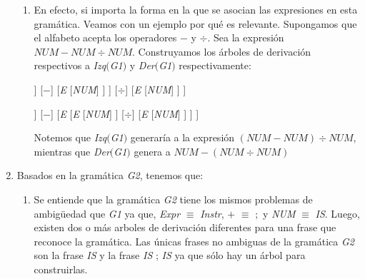 \documentclass[a4paper, 10pt]{article}
\begin{document}
\begin{enumerate}
\begin{enumerate}
			\item En efecto, si importa la forma en la que se asocian las expresiones en esta gramática. Veamos con
			un ejemplo por qué es relevante. Supongamos que el alfabeto acepta los operadores $-$ y $\div$. Sea la expresión
			$\textit{NUM} - \textit{NUM} \div \textit{NUM}$. Construyamos los árboles de derivación respectivos a 
			\textit{Izq}$($\textit{G1}$)$ y \textit{Der}$($\textit{G1}$)$ respectivamente:\\
			\begin{center}
			\begin{forest}
					[\textit{E}
						[\textit{E}
							[\textit{E}
								[\textit{NUM}]
							]
							[$-$]
							[\textit{E}
								[\textit{NUM}]
							]
						]						
						[$\div$]
						[\textit{E}
							[\textit{NUM}]
						]
					]
				\end{forest}		
				\qquad	
				\begin{forest}
					[\textit{E}
						[\textit{E}
							[\textit{NUM}]
						]
						[$-$]
						[\textit{E}
							[\textit{E}
								[\textit{NUM}]
							]
							[$\div$]
							[\textit{E}
								[\textit{NUM}]							
							]
						]
					]
				\end{forest}
			\end{center}
			Notemos que \textit{Izq}$($\textit{G1}$)$ generaría a la expresión $(\textit{NUM} - \textit{NUM}) \div \textit{NUM}$,
			mientras que \textit{Der}$($\textit{G1}$)$ genera a $\textit{NUM} - (\textit{NUM} \div \textit{NUM})$
			
			\end{enumerate}		
			
		\item Basados en la gramática \textit{G2}, tenemos que:
		\begin{enumerate}
			\item Se entiende que la gramática \textit{G2} tiene los mismos problemas de ambigüedad que \textit{G1} ya que, 
			\textit{Expr} $\equiv$ \textit{Instr}, $+$ $\equiv$ $;$ y \textit{NUM} $\equiv$ \textit{IS}. Luego, existen dos o más 
			arboles de derivación diferentes para una frase que reconoce la gramática. Las únicas frases no ambiguas de la gramática
			\textit{G2} son la frase \textit{IS} y la frase \textit{IS} ; \textit{IS} ya que sólo hay un árbol para construirlas.
				

\end{enumerate}
\end{enumerate}
\end{document}
